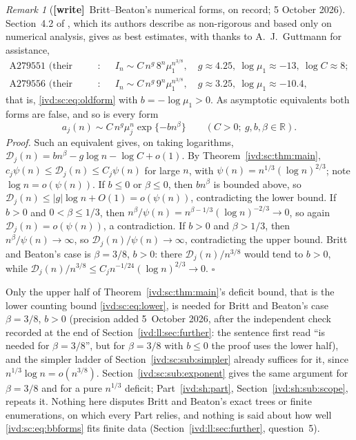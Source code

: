 \documentclass[11pt,letterpaper]{article}
\theoremstyle{remark}\newtheorem{remark}[theorem]{Remark}
\numberwithin{equation}{section}
\newcommand{\Dfc}{\mathcal D}
\newcommand{\wtag}{\textup{\textbf{[write]}}}
\begin{document}
\begin{remark}[\wtag\ Britt--Beaton's numerical forms, on record; 5 October 2026]\label{ivd:sc:rem:bb}
Section~4.2 of \cite{BB}, which its authors describe as non-rigorous and based only on numerical analysis, gives as best estimates, with thanks to A.~J.~Guttmann for assistance,
\begin{equation}\label{ivd:sc:eq:bbforms}
 \begin{aligned}
 \text{A279551 (their (4.12))}:&\quad I_n\sim C\,n^g\,8^n\mu_1^{n^{3/8}},\quad g\approx4.25,\ \log\mu_1\approx-13,\ \log C\approx8;\\
 \text{A279556 (their (4.13))}:&\quad I_n\sim C\,n^g\,9^n\mu_1^{n^{3/8}},\quad g\approx3.25,\ \log\mu_1\approx-10.4,
 \end{aligned}
\end{equation}
that is, \eqref{ivd:sc:eq:oldform} with $b=-\log\mu_1>0$. As asymptotic equivalents both forms are false, and so is every form
\[
 a_j(n)\sim C\,n^g\mu_j^n\exp\{-bn^\beta\}\qquad(C>0;\ g,b,\beta\in\mathbb R).
\]
\emph{Proof.} Such an equivalent gives, on taking logarithms, $\Dfc_j(n)=bn^\beta-g\log n-\log C+o(1)$. By Theorem~\ref{ivd:sc:thm:main}, $c_j\psi(n)\le\Dfc_j(n)\le C_j\psi(n)$ for large $n$, with $\psi(n)=n^{1/3}(\log n)^{2/3}$; note $\log n=o(\psi(n))$. If $b\le0$ or $\beta\le0$, then $bn^\beta$ is bounded above, so $\Dfc_j(n)\le|g|\log n+O(1)=o(\psi(n))$, contradicting the lower bound. If $b>0$ and $0<\beta\le1/3$, then $n^\beta/\psi(n)=n^{\beta-1/3}(\log n)^{-2/3}\to0$, so again $\Dfc_j(n)=o(\psi(n))$, a contradiction. If $b>0$ and $\beta>1/3$, then $n^\beta/\psi(n)\to\infty$, so $\Dfc_j(n)/\psi(n)\to\infty$, contradicting the upper bound. Britt and Beaton's case is $\beta=3/8$, $b>0$: there $\Dfc_j(n)/n^{3/8}$ would tend to $b>0$, while $\Dfc_j(n)/n^{3/8}\le C_jn^{-1/24}(\log n)^{2/3}\to0$. $\square$

Only the upper half of Theorem~\ref{ivd:sc:thm:main}'s deficit bound, that is the lower counting bound \eqref{ivd:sc:eq:lower}, is needed for Britt and Beaton's case $\beta=3/8$, $b>0$ (precision added 5~October 2026, after the independent check recorded at the end of Section~\ref{ivd:ll:sec:further}: the sentence first read ``is needed for $\beta=3/8$'', but for $\beta=3/8$ with $b\le0$ the proof uses the lower half), and the simpler ladder of Section~\ref{ivd:sc:sub:simpler} already suffices for it, since $n^{1/3}\log n=o(n^{3/8})$. Section~\ref{ivd:sc:sub:exponent} gives the same argument for $\beta=3/8$ and for a pure $n^{1/3}$ deficit; Part~\ref{ivd:sh:part}, Section~\ref{ivd:sh:sub:scope}, repeats it. Nothing here disputes Britt and Beaton's exact trees or finite enumerations, on which every Part relies, and nothing is said about how well \eqref{ivd:sc:eq:bbforms} fits finite data (Section~\ref{ivd:ll:sec:further}, question~5).


\end{remark}
\end{document}
